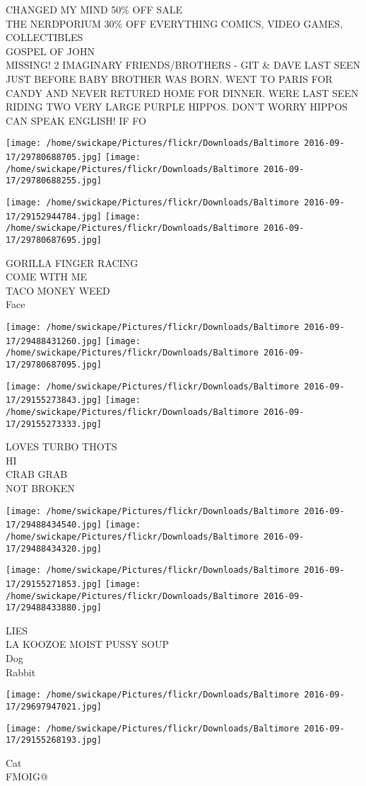 \documentclass[10pt,letterpaper]{article}
\begin{document}
CHANGED MY MIND 50\% OFF SALE\\
THE NERDPORIUM 30\% OFF EVERYTHING COMICS, VIDEO GAMES, COLLECTIBLES\\
GOSPEL OF JOHN\\
MISSING!  2 IMAGINARY FRIENDS/BROTHERS {-} GIT \& DAVE LAST SEEN JUST BEFORE BABY BROTHER WAS BORN.  WENT TO PARIS FOR CANDY AND NEVER RETURED HOME FOR DINNER.  WERE LAST SEEN RIDING TWO VERY LARGE PURPLE HIPPOS.  DON'T WORRY HIPPOS CAN SPEAK ENGLISH!  IF FO
\pagebreak

\texttt{[image: /home/swickape/Pictures/flickr/Downloads/Baltimore 2016-09-17/29780688705.jpg]}
\texttt{[image: /home/swickape/Pictures/flickr/Downloads/Baltimore 2016-09-17/29780688255.jpg]}

\texttt{[image: /home/swickape/Pictures/flickr/Downloads/Baltimore 2016-09-17/29152944784.jpg]}
\texttt{[image: /home/swickape/Pictures/flickr/Downloads/Baltimore 2016-09-17/29780687695.jpg]}

GORILLA FINGER RACING\\
COME WITH ME\\
TACO MONEY WEED\\
Face
\pagebreak

\texttt{[image: /home/swickape/Pictures/flickr/Downloads/Baltimore 2016-09-17/29488431260.jpg]}
\texttt{[image: /home/swickape/Pictures/flickr/Downloads/Baltimore 2016-09-17/29780687095.jpg]}

\texttt{[image: /home/swickape/Pictures/flickr/Downloads/Baltimore 2016-09-17/29155273843.jpg]}
\texttt{[image: /home/swickape/Pictures/flickr/Downloads/Baltimore 2016-09-17/29155273333.jpg]}

LOVES TURBO THOTS\\
HI\\
CRAB GRAB\\
NOT BROKEN
\pagebreak

\texttt{[image: /home/swickape/Pictures/flickr/Downloads/Baltimore 2016-09-17/29488434540.jpg]}
\texttt{[image: /home/swickape/Pictures/flickr/Downloads/Baltimore 2016-09-17/29488434320.jpg]}

\texttt{[image: /home/swickape/Pictures/flickr/Downloads/Baltimore 2016-09-17/29155271853.jpg]}
\texttt{[image: /home/swickape/Pictures/flickr/Downloads/Baltimore 2016-09-17/29488433880.jpg]}

LIES\\
LA KOOZOE MOIST PUSSY SOUP\\
Dog\\
Rabbit
\pagebreak

\texttt{[image: /home/swickape/Pictures/flickr/Downloads/Baltimore 2016-09-17/29697947021.jpg]}

\vspace{0.25in}
\texttt{[image: /home/swickape/Pictures/flickr/Downloads/Baltimore 2016-09-17/29155268193.jpg]}

Cat\\
FMOIG@
\pagebreak
\end{document}
